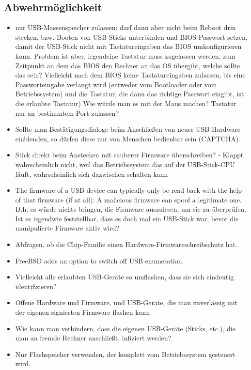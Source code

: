 \documentclass[
a4paper, %
twoside%
]{article}
\begin{document}
\subsection{Abwehrmöglichkeit}
\begin{itemize}
\item nur USB-Massenspeicher zulassen: darf dann aber nicht beim Reboot drin stecken, bzw. Booten von USB-Sticks unterbinden und BIOS-Passwort setzen, damit der USB-Stick nicht mit Tastatureingaben das BIOS umkonfigurieren kann.
Problem ist aber, irgendeine Tastatur muss zugelassen werden, zum Zeitpunkt
an dem das BIOS den Rechner an das OS übergibt, welche sollte das sein?
Vielleicht nach dem BIOS keine Tastatureingaben zulassen, bis eine Passworteingabe verlangt wird (entweder vom Bootloader oder vom Betriebssystem) und die Tastatur, die dann das richtige Passwort eingibt, ist die erlaubte Tastatur)
Wie würde man es mit der Maus machen?
Tastatur nur an bestimmtem Port zulassen?
\item Sollte man Bestätigungsdialoge beim Anschließen von neuer
	USB-Hardware einblenden, so dürfen diese nur von Menschen bedienbar
	sein (CAPTCHA).
\item Stick direkt beim Anstecken mit sauberer Firmware überschreiben? - Klappt
  wahrscheinlich nicht, weil das Betriebssystem das auf der USB-Stick-CPU
läuft, wahrscheinlich sich dazwischen schalten kann
\item The firmware of a USB device can typically only be read back with the help of that firmware (if at all): A malicious firmware can spoof a legitimate one. D.h. es würde nichts bringen, die Firmware auszulesen, um sie zu überprüfen.
Ist es irgendwie feststellbar, dass es doch mal ein USB-Stick war, bevor die manipulierte Firmware aktiv wird?
\item Abfragen, ob die Chip-Familie einen Hardware-Firmwareschreibschutz hat.
\item FreeBSD adds an option to switch off USB enumeration.
\item Vielleicht alle erlaubten USB-Geräte so umflashen, dass sie sich eindeutig identifizieren?
\item Offene Hardware und Firmware, und USB-Geräte, die man zuverlässig mit der eigenen signierten Firmware flashen kann
\item Wie kann man verhindern, dass die eigenen USB-Geräte (Sticks, etc.),
	die man an fremde Rechner anschließt, infiziert werden?
\item Nur Flashspeicher verwenden, der komplett vom Betriebssystem
	gesteuert wird.
\end{itemize}
\end{document}
